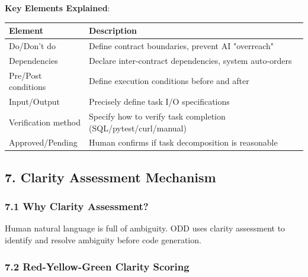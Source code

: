 \documentclass[
]{article}
\begin{document}
\textbf{Key Elements Explained}:

\begin{longtable}[]{@{}ll@{}}
\toprule()
Element & Description \\
\midrule()
\endhead
Do/Don't do & Define contract boundaries, prevent AI "overreach" \\
Dependencies & Declare inter-contract dependencies, system
auto-orders \\
Pre/Post conditions & Define execution conditions before and after \\
Input/Output & Precisely define task I/O specifications \\
Verification method & Specify how to verify task completion
(SQL/pytest/curl/manual) \\
Approved/Pending & Human confirms if task decomposition is reasonable \\
\bottomrule()
\end{longtable}

\hypertarget{7-clarity-assessment-mechanism}{%
\subsection{7. Clarity Assessment
Mechanism}\label{7-clarity-assessment-mechanism}}

\hypertarget{71-why-clarity-assessment}{%
\subsubsection{7.1 Why Clarity
Assessment?}\label{71-why-clarity-assessment}}

Human natural language is full of ambiguity. ODD uses clarity assessment
to identify and resolve ambiguity before code generation.

\hypertarget{72-red-yellow-green-clarity-scoring}{%
\subsubsection{7.2 Red-Yellow-Green Clarity
Scoring}\label{72-red-yellow-green-clarity-scoring}}
\end{document}
